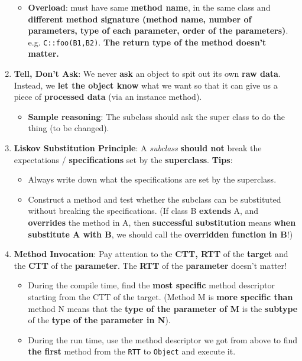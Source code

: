 \documentclass[10pt, landscape]{article}
\begin{document}
\begin{multicols}{4}
\begin{enumerate}
\begin{itemize}
        \item \textbf{Overload}: must have same \textbf{method name}, in the same class and \textbf{different method signature (method name, number of parameters, type of each parameter, order of the parameters)}. e.g. \texttt{C::foo(B1,B2)}. \textbf{The return type of the method doesn't matter.}
    \end{itemize}
    \item \textbf{Tell, Don't Ask}: We never \textbf{ask} an object to spit out its own \textbf{raw data}. Instead, we \textbf{let the object know} what we want so that it can give us a piece of \textbf{processed data} (via an instance method).
    \begin{itemize}
        \item \textbf{Sample reasoning}: The subclass should ask the super class to do the thing (to be changed).
    \end{itemize}
    \item \textbf{Liskov Substitution Principle}: A \textit{subclass} \textbf{should not} break the expectations / \textbf{specifications} set by the \textbf{superclass}. \textbf{Tips}:
    \begin{itemize}
        \item Always write down what the specifications are set by the superclass.
        \item Construct a method and test whether the subclass can be substituted without breaking the specifications. (If class B \textbf{extends} A, and \textbf{overrides} the method in A, then \textbf{successful substitution} means \textbf{when substitute A with B}, we should call the \textbf{overridden function in B}!)
    \end{itemize}
    \item \textbf{Method Invocation}: Pay attention to the \textbf{CTT, RTT} of the \textbf{target} and the \textbf{CTT} of the \textbf{parameter}. The \textbf{RTT} of the \textbf{parameter} doesn't matter!
    \begin{itemize}
        \item During the compile time, find the \textbf{most specific} method descriptor starting from the CTT of the target. (Method M is \textbf{more specific than} method N means that the \textbf{type of the parameter of M} is the \textbf{subtype} of the \textbf{type of the parameter in N}).
        \item During the run time, use the method descriptor we got from above to find \textbf{the first} method from the \texttt{RTT} to \texttt{Object} and execute it.

\end{itemize}
\end{enumerate}
\end{multicols}
\end{document}
